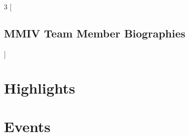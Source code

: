\documentclass[11pt,fleqn]{book} %
\begin{document}
\newpage
\begin{multicols}{3}
[
    \section*{MMIV Team Member Biographies}
]
\end{multicols}



\chapter{Highlights}
\newpage





\chapter{Events}
\newpage




%
%
\end{document}
